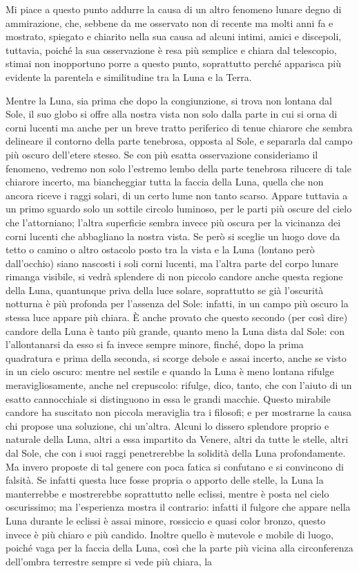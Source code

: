 \documentclass[11pt,twoside,openany]{book}
\begin{document}
Mi piace a questo punto addurre la causa di un altro fenomeno lunare degno di ammirazione, che, sebbene da me osservato non di recente ma molti anni fa e mostrato, spiegato e chiarito nella sua causa ad alcuni intimi, amici e discepoli, tuttavia, poiché la sua osservazione è resa più semplice e chiara dal telescopio, stimai non inopportuno porre a questo punto, soprattutto perché apparisca più evidente la parentela e similitudine tra la Luna e la Terra.

Mentre la Luna, sia prima che dopo la congiunzione, si trova non lontana dal Sole, il suo globo si offre alla nostra vista non solo dalla parte in cui si orna di corni lucenti ma anche per un breve tratto periferico di tenue chiarore che sembra delineare il contorno della parte tenebrosa, opposta al Sole, e separarla dal campo più oscuro dell'etere stesso. Se con più esatta osservazione consideriamo il fenomeno, vedremo non solo l'estremo lembo della parte tenebrosa rilucere di tale chiarore incerto, ma biancheggiar tutta la faccia della Luna, quella che non ancora riceve i raggi solari, di un certo lume non tanto scarso. Appare tuttavia a un primo sguardo solo un sottile circolo luminoso, per le parti più oscure del cielo che l'attorniano; l'altra superficie sembra invece più oscura per la vicinanza dei corni lucenti che abbagliano la nostra vista. Se però si sceglie un luogo dove da tetto o camino o altro ostacolo posto tra la vista e la Luna (lontano però dall'occhio) siano nascosti i soli corni lucenti, ma l'altra parte del corpo lunare rimanga visibile, si vedrà splendere di non piccolo candore anche questa regione della Luna, quantunque priva della luce solare, soprattutto se già l'oscurità notturna è più profonda per l'assenza del Sole: infatti, in un campo più oscuro la stessa luce appare più chiara. È anche provato che questo secondo (per così dire) candore della Luna è tanto più grande, quanto meno la Luna dista dal Sole: con l'allontanarsi da esso si fa invece sempre minore, finché, dopo la prima quadratura e prima della seconda, si scorge debole e assai incerto, anche se visto in un cielo oscuro: mentre nel sestile e quando la Luna è meno lontana rifulge meravigliosamente, anche nel crepuscolo: rifulge, dico, tanto, che con l'aiuto di un esatto cannocchiale si distinguono in essa le grandi macchie. Questo mirabile candore ha suscitato non piccola meraviglia tra i filosofi; e per mostrarne la causa chi propose una soluzione, chi un'altra. Alcuni lo dissero splendore proprio e naturale della Luna, altri a essa impartito da Venere, altri da tutte le stelle, altri dal Sole, che con i suoi raggi penetrerebbe la solidità della Luna profondamente. Ma invero proposte di tal genere con poca fatica si confutano e si convincono di falsità. Se infatti questa luce fosse propria o apporto delle stelle, la Luna la manterrebbe e mostrerebbe soprattutto nelle eclissi, mentre è posta nel cielo oscurissimo; ma l'esperienza mostra il contrario: infatti il fulgore che appare nella Luna durante le eclissi è assai minore, rossiccio e quasi color bronzo, questo invece è più chiaro e più candido. Inoltre quello è mutevole e mobile di luogo, poiché vaga per la faccia della Luna, così che la parte più vicina alla circonferenza dell'ombra terrestre sempre si vede più chiara, la 
\end{document}
